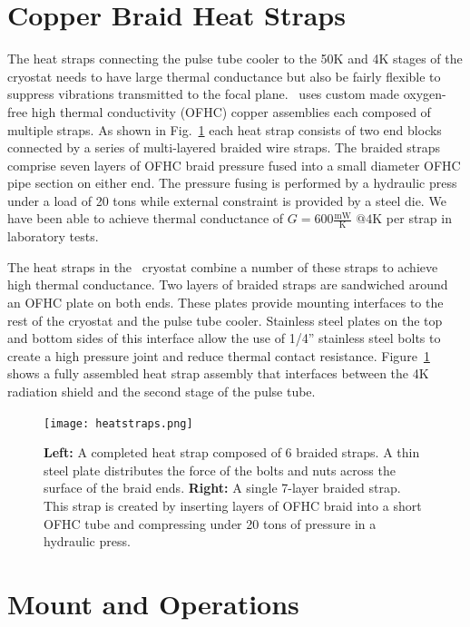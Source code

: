 \documentclass[]{spie}  %
\begin{document}
\section{Copper Braid Heat Straps}

The heat straps connecting the pulse tube cooler to the 50K and 4K stages of
the cryostat needs to have large thermal conductance but also be fairly
flexible to suppress vibrations transmitted to the focal plane. \biceparray\ 
uses custom made oxygen-free high thermal conductivity (OFHC) copper
assemblies each composed of multiple straps. As shown
in Fig.~\ref{fig:heatstrap} each heat strap consists of two end blocks
connected by a series of multi-layered braided wire straps. The braided straps
comprise seven layers of OFHC braid pressure fused into a small diameter OFHC
pipe section on either end. The pressure fusing is performed by a hydraulic
press under a load of 20 tons while external constraint is provided by a steel
die. We have been able to achieve thermal conductance of $G=600
\frac{\text{mW}}{\text{K}} \text{  @}4\text{K}$ per strap in laboratory tests.

The heat straps in the \biceparray\ cryostat combine a number of these straps
to achieve high thermal conductance. Two layers of braided straps are
sandwiched around an OFHC plate on both ends. These plates provide mounting
interfaces to the rest of the cryostat and the pulse tube cooler. Stainless
steel plates on the top and bottom sides of this interface allow the use of
1/4'' stainless steel bolts to create a high pressure joint and reduce thermal
contact resistance. Figure~\ref{fig:heatstrap} shows a fully assembled heat
strap assembly that interfaces between the 4K radiation shield and the second
stage of the pulse tube.

\clearpage


\begin{figure}[ht]
\center
\texttt{[image: heatstraps.png]}
\caption{\textbf{Left:} A completed heat strap composed of 6 braided straps. A thin steel plate distributes the force of the bolts and nuts across the surface of the braid ends. \textbf{Right:} A single 7-layer braided strap. This strap is created by inserting layers of OFHC braid into a short OFHC tube and compressing under 20 tons of pressure in a hydraulic press.}
\label{fig:heatstrap}
\end{figure}


\section{Mount and Operations}
\end{document}
